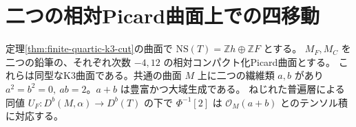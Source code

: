 \section{二つの相対Picard曲面上での四移動}
\label{sec:finite-residual-picard-surfaces}
\begin{theorem}\label{thm:residual-picard-surface-transport}
定理\ref{thm:finite-quartic-k3-cut}の曲面で $\mathrm{NS}(T)=\mathbb Zh\oplus\mathbb ZF$ とする。
$M_F,M_C$ を二つの鉛筆の、それぞれ次数 $-4,12$ の相対コンパクト化Picard曲面とする。
これらは同型なK3曲面である。共通の曲面 $M$ 上に二つの繊維類 $a,b$ があり
$a^2=b^2=0,\ ab=2$。$a+b$ は豊富かつ大域生成である。
ねじれた普遍層による同値 $U_F:D^b(M,\alpha)\to D^b(T)$ の下で
$\Phi^{-1}[2]$ は $\mathcal O_M(a+b)$ とのテンソル積に対応する。
\end{theorem}
